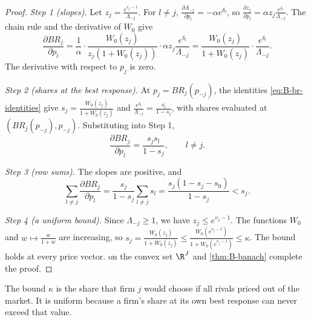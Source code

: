 \begin{proof}
\emph{Step 1 (slopes).} Let $z_j = \frac{e^{v_j - 1}}{\Lambda_{-j}}$. For $l \neq j$, $\frac{\partial
\Lambda_{-j}}{\partial p_l} = -\alpha e^{\delta_l}$, so $\frac{\partial z_j}{\partial p_l} = \alpha
z_j\frac{e^{\delta_l}}{\Lambda_{-j}}$. The chain rule and the derivative of $W_0$ give
\begin{equation*}
  \frac{\partial BR_j}{\partial p_l} = \frac{1}{\alpha}\cdot\frac{W_0(z_j)}{z_j(1 + W_0(z_j))}\cdot\alpha
  z_j\frac{e^{\delta_l}}{\Lambda_{-j}} = \frac{W_0(z_j)}{1 + W_0(z_j)}\cdot\frac{e^{\delta_l}}{\Lambda_{-j}}.
\end{equation*}
The derivative with respect to $p_j$ is zero.

\emph{Step 2 (shares at the best response).} At $p_j = BR_j(p_{-j})$, the identities
\eqref{eq:B-br-identities} give $s_j = \frac{W_0(z_j)}{1 + W_0(z_j)}$ and $\frac{e^{\delta_l}}{\Lambda_{-j}} =
\frac{s_l}{1 - s_j}$, with shares evaluated at $(BR_j(p_{-j}), p_{-j})$. Substituting into Step 1,
\begin{equation*}
  \frac{\partial BR_j}{\partial p_l} = \frac{s_js_l}{1 - s_j}, \qquad l \neq j.
\end{equation*}

\emph{Step 3 (row sums).} The slopes are positive, and
\begin{equation*}
  \sum_{l \neq j}\frac{\partial BR_j}{\partial p_l} = \frac{s_j}{1 - s_j}\sum_{l \neq j}s_l = \frac{s_j(1 - s_j
  - s_0)}{1 - s_j} < s_j.
\end{equation*}

\emph{Step 4 (a uniform bound).} Since $\Lambda_{-j} \geq 1$, we have $z_j \leq e^{v_j - 1}$. The functions $W_0$
and $w \mapsto \frac{w}{1 + w}$ are increasing, so $s_j = \frac{W_0(z_j)}{1 + W_0(z_j)} \leq \frac{W_0(e^{v_j -
1})}{1 + W_0(e^{v_j - 1})} \leq \kappa$. The bound holds at every price vector. 
on the convex set $\R^J$ and \cref{thm:B-banach} complete the proof.
\end{proof}

The bound $\kappa$ is the share that firm $j$ would choose if all rivals priced out of the market. It is
uniform because a firm's share at its own best response can never exceed that value.

